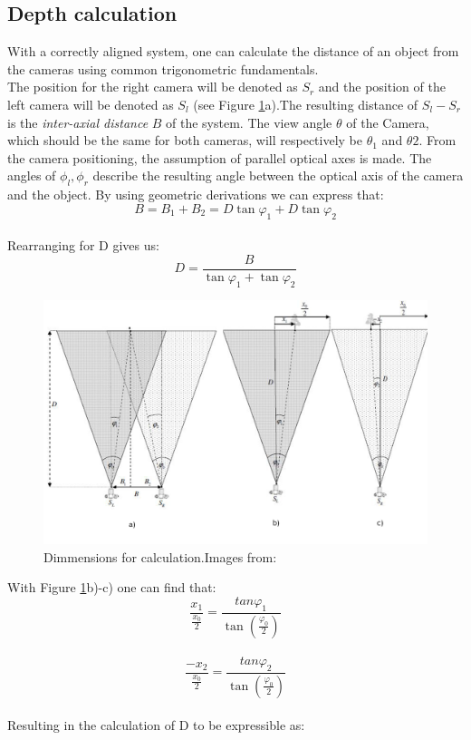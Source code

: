 \subsection{Depth calculation}
With a correctly aligned system, one can calculate the distance of an object from the cameras using common trigonometric fundamentals\cite{JernejMrovlje.2008,YasirDawoodSalman.2017}.
\\
The position for the right camera will be denoted as $S_{r}$ and the position of the left camera will be denoted as $S_{l}$ (see Figure \ref{stereo_Dimmensions}a).The resulting distance of $S_{l}-S_{r}$ is the \textit{inter-axial distance} $B$ of the system. The view angle $\theta$ of the Camera, which should be the same for both cameras, will respectively be $\theta_{1}$ and $\theta{2}$. From the camera positioning, the assumption of parallel optical axes is made. The angles of $\phi_{l},\phi_{r}$ describe the resulting angle between the optical axis of the camera and the object.
By using geometric derivations we can express that:\\
\begin{equation}
B= B_{1}+B_{2}=D\tan\varphi_{1}+D\tan\varphi_{2}
\end{equation}\\
Rearranging for D gives us:\\
\begin{equation}
D = \frac{B}{\tan\varphi_{1}+\tan\varphi_{2}}
\end{equation}
\begin{figure}[H]
\includegraphics[width=\textwidth]{images/Stereo_Calc_4.JPG}
\caption{Dimmensions for calculation.Images from:\cite{JernejMrovlje.2008}}
\label{stereo_Dimmensions} 
\end{figure}
With Figure \ref{stereo_Dimmensions}b)-c) one can find that:
\begin{equation}
\frac{x_{1}}{\frac{x_{0}}{2}}=\frac{tan \varphi_1}{\tan(\frac{\varphi_{0}}{2})}
\end{equation}\\
\begin{equation}
\frac{-x_{2}}{\frac{x_{0}}{2}}=\frac{tan \varphi_2}{\tan(\frac{\varphi_{0}}{2})}
\end{equation}\\
Resulting in the calculation of D to be expressible as:

